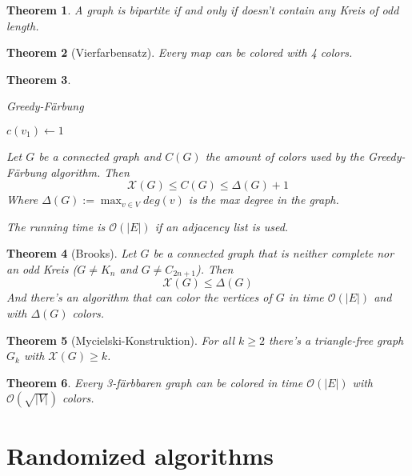 \documentclass[12pt]{extarticle}
\theoremstyle{definition}
\theoremstyle{remark}
\theoremstyle{plain}
\newtheorem{theorem}{Theorem}
\theoremstyle{plain}
\theoremstyle{plain}
\newcommand{\BO}{\mathcal{O}}
\begin{document}
\begin{theorem}
    A graph is bipartite if and only if doesn't contain any Kreis of odd length.
\end{theorem}

\begin{theorem}[Vierfarbensatz]
    Every map can be colored with 4 colors.
\end{theorem}

\begin{theorem}
    \begin{algorithm}
        \caption{Greedy-Färbung}
        $c(v_1) \gets 1$\;
    \end{algorithm}

    Let $G$ be a connected graph and $C(G)$ the amount of colors used by the Greedy-Färbung algorithm.
    Then
    \[ \mathcal{X}(G) \le C(G) \le \Delta(G) + 1 \]
    Where $\Delta(G) := \max_{v \in V} deg(v)$ is the max degree in the graph.

    The running time is $\BO(|E|)$ if an adjacency list is used.
\end{theorem}

\begin{theorem}[Brooks]
    Let $G$ be a connected graph that is neither complete nor an odd Kreis ($G \ne K_n$ and $G \ne C_{2n+1}$).
    Then
    \[ \mathcal{X}(G) \le \Delta(G) \]
    And there's an algorithm that can color the vertices of $G$ in time $\BO(|E|)$ and with $\Delta(G)$ colors.
\end{theorem}

\begin{theorem}[Mycielski-Konstruktion]
    For all $k \ge 2$ there's a triangle-free graph $G_k$ with $\mathcal{X}(G) \ge k$.
\end{theorem}

\begin{theorem}
    Every 3-färbbaren graph can be colored in time $\BO(|E|)$ with $\BO(\sqrt{|V|})$ colors.
\end{theorem}

\section{Randomized algorithms}
\end{document}
